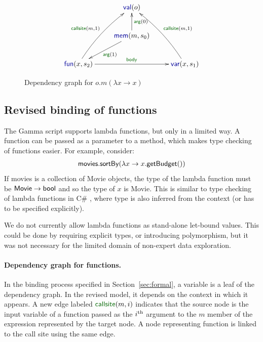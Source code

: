 \documentclass[sigplan,10pt]{acmart}\settopmatter{printfolios=true,printccs=false,printacmref=false}
\theoremstyle{plain}
\theoremstyle{definition}
\newcommand{\ident}[1]{\textnormal{\sffamily #1}}
\newcommand{\bnd}[1]{\textnormal{\textcolor{kvdclr}{\sffamily #1}}}
\newcommand{\blbl}[1]{\textnormal{\textcolor{numclr}{\sffamily #1}}}
\begin{document}
\begin{figure}[!b]
\vspace{-0.5em}
\begin{equation*}
\xymatrix{
&\bnd{val}(o)\\
&\bnd{mem}(m, s_0) \ar[u]_{\blbl{arg}(0)} \ar[dl]^{\blbl{arg}(1)} \\
\bnd{fun}(x, s_2) \ar@/^/[uur]^{\blbl{callsite}(m, 1)} \ar[rr]^{\blbl{body}} && \bnd{var}(x, s_1) \ar@/_/[uul]_{\blbl{callsite}(m, 1)}
}  
\end{equation*}
\caption{Dependency graph for $o.m(\lambda x\rightarrow x)$}
\label{fig:graph-func}
\end{figure}


\subsection{Revised binding of functions}
\label{sec:types-funs}

The Gamma script supports lambda functions, but only in a limited way. A function can be passed
as a parameter to a method, which makes type checking of functions easier. For example, consider:
%
\begin{equation*}
\begin{array}{l}  
\ident{movies}.\ident{sortBy}(\lambda x \rightarrow x.\ident{getBudget}())
\end{array}
\end{equation*}
%
If \ident{movies} is a collection of \ident{Movie} objects, the type of the lambda function must be
$\ident{Movie}\rightarrow\ident{bool}$ and so the type of $x$ is \ident{Movie}. This is similar to
type checking of lambda functions in C\# \cite{csharp}, where type is also inferred from the context (or has
to be specified explicitly). 

We do not currently allow lambda functions as stand-alone let-bound 
values. This could be done by requiring explicit types, or introducing polymorphism, but it was not
necessary for the limited domain of non-expert data exploration.

\paragraph{Dependency graph for functions.}
In the binding process specified in Section~\ref{sec:formal}, a variable is a leaf of the dependency
graph. In the revised model, it depends on the context in which it appears. A new edge labeled
$\blbl{callsite}(m, i)$ indicates that the source node is the input variable of a function 
passed as the $i^\textnormal{th}$ argument to the $m$ member of the expression represented by the
target node. A node representing function is linked to the call site using the same edge.
\end{document}
